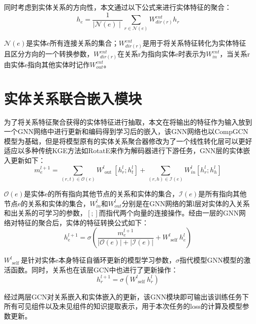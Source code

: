 同时考虑到实体关系的方向性，本文通过以下公式来进行实体特征的聚合：
\begin{equation}
  h_{e} = \frac{1}{ \mid \mathcal{N}(e) \mid} \sum_{r\in\mathcal{N}(e)} W^{ent}_{dir(r) }h_{r} \label{eq:3-11}
\end{equation}

\(\mathcal{N}(e)\)是实体e所有连接关系的集合；\(W^{ent}_{dir(r)}\)是用于将关系特征转化为实体特征且区分方向的一个转换参数，\(W^{ent}_{dir(r)}\)在关系r为指向实体e时表示为\(W^{ent}_{in}\)，当关系r由实体e指向其他实体时记作\(W^{ent}_{out}\)。

\section{实体关系联合嵌入模块}
为了将关系特征聚合获得的实体特征进行抽取，本文在将输出的特征作为输入放到一个GNN网络中进行更新和编码得到学习后的嵌入，该GNN网络也以CompGCN模型为基础，但是将模型原有的实体关系聚合器修改为了一个线性转化层可以更好适应以多种传统KGE方法如RotatE来作为解码器进行下游任务，GNN层的实体嵌入更新如下：
\begin{equation}
  m _ { e } ^ { l + 1 } = \sum _ { ( r , t ) \in \mathcal{O} ( e ) } W _ { \text { out } } ^ { l } [ h _ { r } ^ { l } ; h _ { t } ^ { l } ] + \sum _ { ( r , h ) \in\mathcal{I} ( e ) } W _ { in } ^ { l } [ h _ { r } ^ { l } ; h _ { h } ^ { l } ]  \label{eq:3-12}
\end{equation}

\(\mathcal{O} ( e )\)是实体e的所有指向其他节点的关系和实体的集合，\(\mathcal{I} ( e )\)是所有指向其他节点e的关系和实体的集合，\( W _ { in } ^ { l }\)和\( W _ { out } ^ { l }\)分别是在GNN网络的第l层对实体的入关系和出关系的可学习的参数，\([;]\)而指代两个向量的连接操作。经由一层的GNN网络对特征的聚合后，实体的特征转换公式如下：
\begin{equation}
  h _ { e } ^ { l + 1 } = \sigma \left( \frac { m _ { e } ^ { l + 1 } } { | \mathcal{O} ( e ) | + | \mathcal{I} ( e ) | } + W _ { \text { self } } ^ { l } h _ { e } ^ { l } \right) \label{eq:3-13}
\end{equation}

\(W _ { \text { self } } ^ { l }\)是针对实体e本身特征自循环更新的模型学习参数，\(\sigma\)指代模型GNN模型的激活函数。同时，关系也在该层GCN中也进行了更新操作：
\begin{equation}
  h _ { r } ^ { l + 1 } = \sigma (W _ { \text { self } } ^ { l } h _ { r } ^ { l }) \label{eq:3-14}
\end{equation}

经过两层GCN对关系嵌入和实体嵌入的更新，该GNN模块即可输出该训练任务下所有可见组件以及未见组件的知识提取表示，用于本次任务的loss的计算及模型参数更新。

